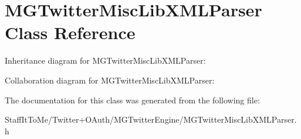 \hypertarget{interface_m_g_twitter_misc_lib_x_m_l_parser}{
\section{\-M\-G\-Twitter\-Misc\-Lib\-X\-M\-L\-Parser \-Class \-Reference}
\label{interface_m_g_twitter_misc_lib_x_m_l_parser}
}


\-Inheritance diagram for \-M\-G\-Twitter\-Misc\-Lib\-X\-M\-L\-Parser\-:


\-Collaboration diagram for \-M\-G\-Twitter\-Misc\-Lib\-X\-M\-L\-Parser\-:


\-The documentation for this class was generated from the following file\-:\begin{DoxyCompactItemize}
\item 
\-Staff\-It\-To\-Me/\-Twitter+\-O\-Auth/\-M\-G\-Twitter\-Engine/\-M\-G\-Twitter\-Misc\-Lib\-X\-M\-L\-Parser.\-h\end{DoxyCompactItemize}
